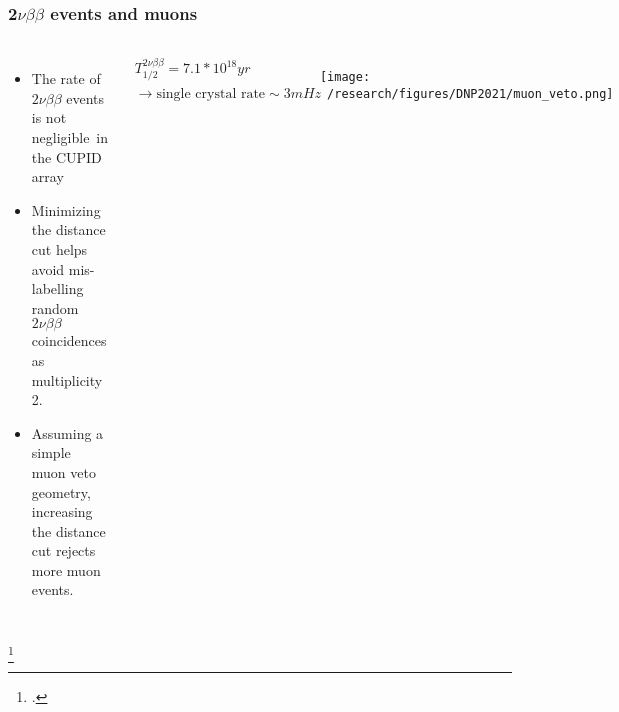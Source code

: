 \documentclass{beamer}
\begin{document}
	\begin{frame}
		\frametitle{2$\nu\beta\beta$ events and muons}
		\begin{columns}[c] %
			
			\begin{itemize}
				\setlength\itemsep{2em}				
				\item The rate of $2\nu\beta\beta$ events is not negligible\footnotemark \ in the CUPID array
				\item Minimizing the distance cut helps avoid mis-labelling random $2\nu\beta\beta$ coincidences as multiplicity 2.
				\item Assuming a simple muon veto geometry, increasing the distance cut rejects more muon events.
			\end{itemize}
			
			\begin{eqnarray*}
			T_{1/2}^{2\nu\beta\beta} = 7.1* 10^{18} yr \\ 
			\rightarrow \text{single crystal rate} \sim 3mHz
			\end{eqnarray*}			
			
			\begin{figure}
			\texttt{[image: ~/research/figures/DNP2021/muon\_veto.png]}
			\end{figure}
			
		\end{columns}
		\footcitetext{arxiv.org/abs/1912.07272}
	\end{frame}


\end{document}
